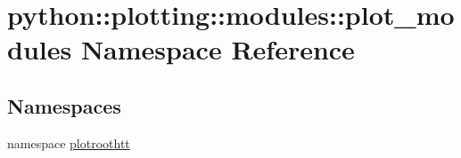 \hypertarget{namespacepython_1_1plotting_1_1modules_1_1plot__modules}{
\section{python::plotting::modules::plot\_\-modules Namespace Reference}
\label{namespacepython_1_1plotting_1_1modules_1_1plot__modules}
}
\subsection*{Namespaces}
\begin{DoxyCompactItemize}
\item 
namespace \hyperlink{namespacepython_1_1plotting_1_1modules_1_1plot__modules_1_1plotroothtt}{plotroothtt}
\end{DoxyCompactItemize}
